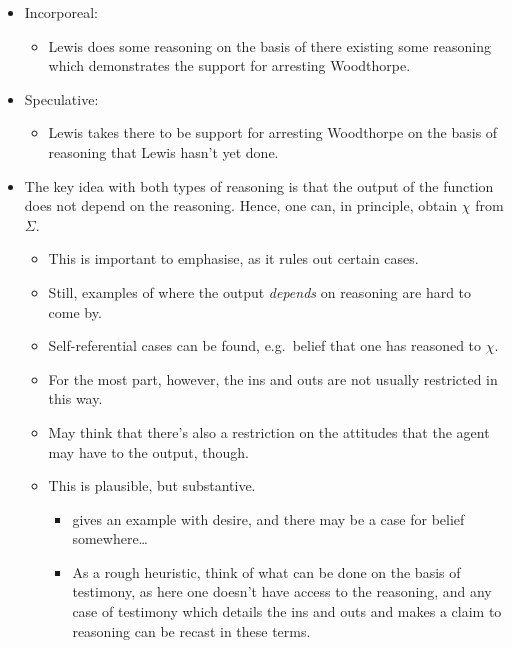 \documentclass[10pt]{article}
\newcommand{\futin}{\ensuremath{\Sigma}}
\newcommand{\futout}{\ensuremath{\chi}}
\begin{document}
\begin{itemize}
\item Incorporeal:
  \begin{itemize}
  \item Lewis does some reasoning on the basis of there existing some reasoning which demonstrates the support for arresting Woodthorpe.
  \end{itemize}
\item Speculative:
  \begin{itemize}
  \item Lewis takes there to be support for arresting Woodthorpe on the basis of reasoning that Lewis hasn't yet done.
  \end{itemize}
\item The key idea with both types of reasoning is that the output of the function does not depend on the reasoning.
  Hence, one can, in principle, obtain \(\futout\) from \(\futin\).
  \begin{itemize}
  \item This is important to emphasise, as it rules out certain cases.
  \item Still, examples of where the output \emph{depends} on reasoning are hard to come by.
  \item Self-referential cases can be found, e.g.\ belief that one has reasoned to \(\futout\).
  \item For the most part, however, the ins and outs are not usually restricted in this way.
  \item May think that there's also a restriction on the attitudes that the agent may have to the output, though.
  \item This is plausible, but substantive.
    \begin{itemize}
    \item \citeauthor{Sinhababu:2017aa} gives an example with desire, and there may be a case for belief somewhere\dots
    \item As a rough heuristic, think of what can be done on the basis of testimony, as here one doesn't have access to the reasoning, and any case of testimony which details the ins and outs and makes a claim to reasoning can be recast in these terms.
    \end{itemize}
  \end{itemize}
\end{itemize}
\end{document}
